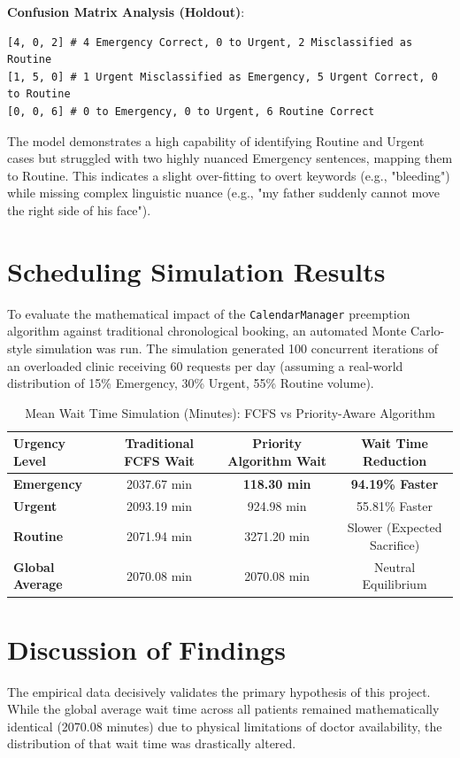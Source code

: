 \documentclass[12pt,a4paper]{report}
\begin{document}
\textbf{Confusion Matrix Analysis (Holdout)}:
\begin{verbatim}
[4, 0, 2] # 4 Emergency Correct, 0 to Urgent, 2 Misclassified as Routine
[1, 5, 0] # 1 Urgent Misclassified as Emergency, 5 Urgent Correct, 0 to Routine
[0, 0, 6] # 0 to Emergency, 0 to Urgent, 6 Routine Correct
\end{verbatim}

The model demonstrates a high capability of identifying Routine and Urgent cases but struggled with two highly nuanced Emergency sentences, mapping them to Routine. This indicates a slight over-fitting to overt keywords (e.g., "bleeding") while missing complex linguistic nuance (e.g., "my father suddenly cannot move the right side of his face").

\section{Scheduling Simulation Results}
To evaluate the mathematical impact of the \texttt{CalendarManager} preemption algorithm against traditional chronological booking, an automated Monte Carlo-style simulation was run. The simulation generated 100 concurrent iterations of an overloaded clinic receiving 60 requests per day (assuming a real-world distribution of 15\% Emergency, 30\% Urgent, 55\% Routine volume).

\begin{table}[H]
\centering
\caption{Mean Wait Time Simulation (Minutes): FCFS vs Priority-Aware Algorithm}
\begin{tabular}{|l|c|c|c|}
\hline
\textbf{Urgency Level} & \textbf{Traditional FCFS Wait} & \textbf{Priority Algorithm Wait} & \textbf{Wait Time Reduction} \\ \hline
\textbf{Emergency} & 2037.67 min & \textbf{118.30 min} & \textbf{94.19\% Faster} \\ \hline
\textbf{Urgent} & 2093.19 min & 924.98 min & 55.81\% Faster \\ \hline
\textbf{Routine} & 2071.94 min & 3271.20 min & Slower (Expected Sacrifice) \\ \hline
\textbf{Global Average} & 2070.08 min & 2070.08 min & Neutral Equilibrium \\ \hline
\end{tabular}
\end{table}

\section{Discussion of Findings}
The empirical data decisively validates the primary hypothesis of this project. While the global average wait time across all patients remained mathematically identical (2070.08 minutes) due to physical limitations of doctor availability, the distribution of that wait time was drastically altered. 
\end{document}
